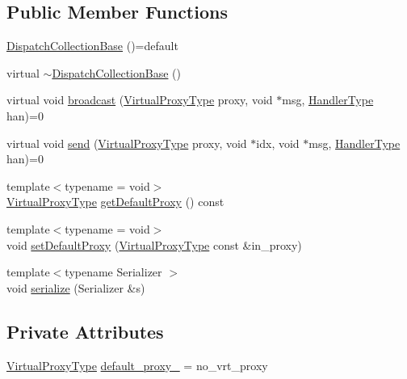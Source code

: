\subsection*{Public Member Functions}
\begin{DoxyCompactItemize}
\item 
\hyperlink{structvt_1_1vrt_1_1collection_1_1_dispatch_collection_base_a96f6594a04faa4519a553b18bf2b2e6d}{Dispatch\+Collection\+Base} ()=default
\item 
virtual \hyperlink{structvt_1_1vrt_1_1collection_1_1_dispatch_collection_base_a8c27f42a9b91fd31b0aa7b30da4d614c}{$\sim$\+Dispatch\+Collection\+Base} ()
\item 
virtual void \hyperlink{structvt_1_1vrt_1_1collection_1_1_dispatch_collection_base_a339eda5b1ee045a9ec400d34bf91ac97}{broadcast} (\hyperlink{namespacevt_a1b417dd5d684f045bb58a0ede70045ac}{Virtual\+Proxy\+Type} proxy, void $\ast$msg, \hyperlink{namespacevt_af64846b57dfcaf104da3ef6967917573}{Handler\+Type} han)=0
\item 
virtual void \hyperlink{structvt_1_1vrt_1_1collection_1_1_dispatch_collection_base_a7e409e791d9eafb8fea0f4f7d97ad860}{send} (\hyperlink{namespacevt_a1b417dd5d684f045bb58a0ede70045ac}{Virtual\+Proxy\+Type} proxy, void $\ast$idx, void $\ast$msg, \hyperlink{namespacevt_af64846b57dfcaf104da3ef6967917573}{Handler\+Type} han)=0
\item 
{\footnotesize template$<$typename  = void$>$ }\\\hyperlink{namespacevt_a1b417dd5d684f045bb58a0ede70045ac}{Virtual\+Proxy\+Type} \hyperlink{structvt_1_1vrt_1_1collection_1_1_dispatch_collection_base_a7ff0d68977083eb225da837b6a8cef7d}{get\+Default\+Proxy} () const
\item 
{\footnotesize template$<$typename  = void$>$ }\\void \hyperlink{structvt_1_1vrt_1_1collection_1_1_dispatch_collection_base_a3c5ad977c57108fdcfcc3c2b443428e3}{set\+Default\+Proxy} (\hyperlink{namespacevt_a1b417dd5d684f045bb58a0ede70045ac}{Virtual\+Proxy\+Type} const \&in\+\_\+proxy)
\item 
{\footnotesize template$<$typename Serializer $>$ }\\void \hyperlink{structvt_1_1vrt_1_1collection_1_1_dispatch_collection_base_a3877e21e6387d8cd9a0ca8c8d4a7ea4e}{serialize} (Serializer \&s)
\end{DoxyCompactItemize}
\subsection*{Private Attributes}
\begin{DoxyCompactItemize}
\item 
\hyperlink{namespacevt_a1b417dd5d684f045bb58a0ede70045ac}{Virtual\+Proxy\+Type} \hyperlink{structvt_1_1vrt_1_1collection_1_1_dispatch_collection_base_ad192b793a3929262a6b44951b628d215}{default\+\_\+proxy\+\_\+} = no\+\_\+vrt\+\_\+proxy
\end{DoxyCompactItemize}


